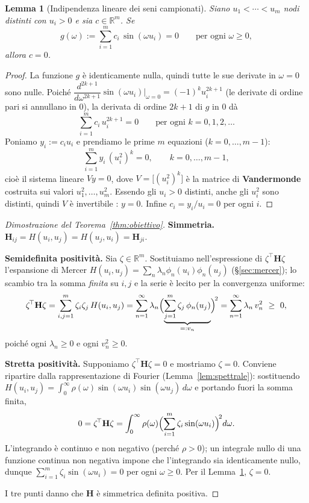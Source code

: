 \documentclass[11pt,a4paper]{article}
\theoremstyle{plain}
\newtheorem{lemma}[teorema]{Lemma}
\theoremstyle{remark}
\newcommand{\Hmat}{\mathbf{H}}
\newcommand{\transp}{^{\!\top}}
\newcommand{\R}{\mathbb{R}}
\begin{document}
\begin{lemma}[Indipendenza lineare dei seni campionati]
\label{lem:indip}
Siano $u_1<\cdots<u_m$ nodi \emph{distinti} con $u_i>0$ e sia $c\in\R^m$. Se
\[
  g(\omega):=\sum_{i=1}^m c_i\,\sin(\omega u_i)=0 \qquad\text{per ogni }\omega\ge0,
\]
allora $c=0$.
\end{lemma}
\begin{proof}
La funzione $g$ \`e identicamente nulla, quindi tutte le sue derivate in $\omega=0$ sono nulle.
Poich\'e $\dfrac{d^{2k+1}}{d\omega^{2k+1}}\sin(\omega u_i)\Big|_{\omega=0}=(-1)^k u_i^{2k+1}$
(le derivate di ordine pari si annullano in $0$), la derivata di ordine $2k+1$ di $g$ in $0$ d\`a
\[
  \sum_{i=1}^m c_i\,u_i^{2k+1}=0 \qquad\text{per ogni }k=0,1,2,\dots
\]
Poniamo $y_i:=c_i u_i$ e prendiamo le prime $m$ equazioni ($k=0,\dots,m-1$):
\[
  \sum_{i=1}^m y_i\,(u_i^2)^{k}=0,\qquad k=0,\dots,m-1,
\]
cio\`e il sistema lineare $V y=0$, dove $V=\bigl[(u_i^2)^{k}\bigr]$ \`e la matrice di
\textbf{Vandermonde} costruita sui valori $u_1^2,\dots,u_m^2$. Essendo gli $u_i>0$ distinti,
anche gli $u_i^2$ sono distinti, quindi $V$ \`e invertibile \cite{quarteroni2017}: $y=0$. Infine
$c_i=y_i/u_i=0$ per ogni $i$.
\end{proof}

\begin{proof}[Dimostrazione del Teorema~\ref{thm:obiettivo}]
\textbf{Simmetria.} $\Hmat_{ij}=H(u_i,u_j)=H(u_j,u_i)=\Hmat_{ji}$.

\textbf{Semidefinita positivit\`a.} Sia $\zeta\in\R^m$. Sostituiamo nell'espressione di
$\zeta\transp\Hmat\zeta$ l'espansione di Mercer $H(u_i,u_j)=\sum_n\lambda_n\phi_n(u_i)\phi_n(u_j)$
(§\ref{sec:mercer}); lo scambio tra la somma \emph{finita} su $i,j$ e la serie \`e lecito per la
convergenza uniforme:
\[
  \zeta\transp\Hmat\zeta
  = \sum_{i,j=1}^m \zeta_i\zeta_j\,H(u_i,u_j)
  = \sum_{n=1}^\infty \lambda_n\Bigl(\underbrace{\sum_{j=1}^m \zeta_j\,\phi_n(u_j)}_{=:v_n}\Bigr)^{\!2}
  = \sum_{n=1}^\infty \lambda_n\,v_n^2\ \ge\ 0,
\]
poich\'e ogni $\lambda_n\ge0$ e ogni $v_n^2\ge0$.

\textbf{Stretta positivit\`a.} Supponiamo $\zeta\transp\Hmat\zeta=0$ e mostriamo $\zeta=0$.
Conviene ripartire dalla rappresentazione di Fourier (Lemma~\ref{lem:spettrale}): sostituendo
$H(u_i,u_j)=\int_0^\infty\rho(\omega)\sin(\omega u_i)\sin(\omega u_j)\,d\omega$ e portando fuori
la somma finita,
\[
  0=\zeta\transp\Hmat\zeta
   =\int_0^\infty \rho(\omega)\Bigl(\sum_{i=1}^m \zeta_i\sin(\omega u_i)\Bigr)^{\!2} d\omega .
\]
L'integrando \`e continuo e non negativo (perch\'e $\rho>0$); un integrale nullo di una funzione
continua non negativa impone che l'integrando sia identicamente nullo, dunque
$\sum_{i=1}^m \zeta_i\sin(\omega u_i)=0$ per ogni $\omega\ge0$. Per il Lemma~\ref{lem:indip},
$\zeta=0$.

I tre punti danno che $\Hmat$ \`e simmetrica definita positiva.
\end{proof}
\end{document}
